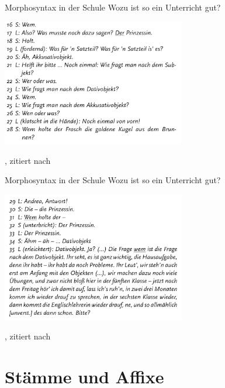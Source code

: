 \begin{frame}
  {Morphosyntax in der Schule}
  Wozu ist so ein Unterricht gut?
  \begin{center}
    \includegraphics[width=0.6\textwidth]{graphics/kasusschule2}
  \end{center}
  \tiny \citet[36--37]{Gramzowemden2002}, zitiert nach \citet[257--258]{Bredel2013}
\end{frame}

\begin{frame}
  {Morphosyntax in der Schule}
  Wozu ist so ein Unterricht gut?
  \begin{center}
    \includegraphics[width=0.6\textwidth]{graphics/kasusschule3}
  \end{center}
  \tiny \citet[36--37]{Gramzowemden2002}, zitiert nach \citet[257--258]{Bredel2013}
\end{frame}

\section{Stämme und Affixe}

